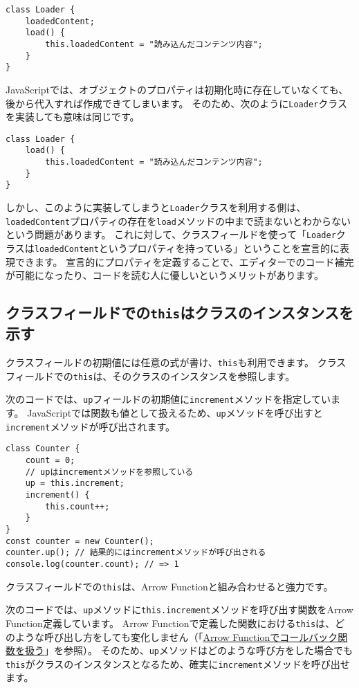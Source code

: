 \begin{lstlisting}
class Loader {
    loadedContent;
    load() {
        this.loadedContent = "読み込んだコンテンツ内容";
    }
}
\end{lstlisting}

JavaScriptでは、オブジェクトのプロパティは初期化時に存在していなくても、後から代入すれば作成できてしまいます。
そのため、次のように\texttt{Loader}クラスを実装しても意味は同じです。

\begin{lstlisting}
class Loader {
    load() {
        this.loadedContent = "読み込んだコンテンツ内容";
    }
}
\end{lstlisting}

しかし、このように実装してしまうと\texttt{Loader}クラスを利用する側は、\texttt{loadedContent}プロパティの存在を\texttt{load}メソッドの中まで読まないとわからないという問題があります。
これに対して、クラスフィールドを使って「\texttt{Loader}クラスは\texttt{loadedContent}というプロパティを持っている」ということを宣言的に表現できます。
宣言的にプロパティを定義することで、エディターでのコード補完が可能になったり、コードを読む人に優しいというメリットがあります。

\hypertarget{this-in-class-fields}{%
\subsection{クラスフィールドでの\texttt{this}はクラスのインスタンスを示す}\label{this-in-class-fields}}

クラスフィールドの初期値には任意の式が書け、\texttt{this}も利用できます。
クラスフィールドでの\texttt{this}は、そのクラスのインスタンスを参照します。

次のコードでは、\texttt{up}フィールドの初期値に\texttt{increment}メソッドを指定しています。
JavaScriptでは関数も値として扱えるため、\texttt{up}メソッドを呼び出すと\texttt{increment}メソッドが呼び出されます。

\begin{lstlisting}
class Counter {
    count = 0;
    // upはincrementメソッドを参照している
    up = this.increment;
    increment() {
        this.count++;
    }
}
const counter = new Counter();
counter.up(); // 結果的にはincrementメソッドが呼び出される
console.log(counter.count); // => 1
\end{lstlisting}

クラスフィールドでの\texttt{this}は、Arrow Functionと組み合わせると強力です。

次のコードでは、\texttt{up}メソッドに\texttt{this.increment}メソッドを呼び出す関数をArrow Function定義しています。
Arrow Functionで定義した関数における\texttt{this}は、どのような呼び出し方をしても変化しません（「\hyperlink{arrow-function-callback}{Arrow Functionでコールバック関数を扱う}」を参照）。
そのため、\texttt{up}メソッドはどのような呼び方をした場合でも\texttt{this}がクラスのインスタンスとなるため、確実に\texttt{increment}メソッドを呼び出せます。

